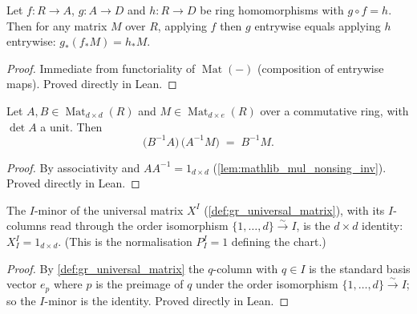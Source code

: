 \begin{lemma}\leanok
  \label{lem:gr_map_map_eq_of_comp}
  Let \(f : R \to A\), \(g : A \to D\) and \(h : R \to D\) be ring
  homomorphisms with \(g \circ f = h\). Then for any matrix \(M\) over \(R\),
  applying \(f\) then \(g\) entrywise equals applying \(h\) entrywise:
  \(g_\ast(f_\ast M) = h_\ast M\).
\end{lemma}
\begin{proof}

\leanok
  Immediate from functoriality of \(\operatorname{Mat}(-)\) (composition of
  entrywise maps). Proved directly in Lean.
\end{proof}

\begin{lemma}\leanok
  \label{lem:gr_inv_mul_inv_mul_cancel}
  Let \(A, B \in \operatorname{Mat}_{d\times d}(R)\) and
  \(M \in \operatorname{Mat}_{d\times e}(R)\) over a commutative ring, with
  \(\det A\) a unit. Then
  \[
    \bigl(B^{-1} A\bigr)\,\bigl(A^{-1} M\bigr) \;=\; B^{-1} M.
  \]
\end{lemma}
\begin{proof}

\leanok
  By associativity and \(A A^{-1} = 1_{d\times d}\)
  (\cref{lem:mathlib_mul_nonsing_inv}). Proved directly in Lean.
\end{proof}

\begin{lemma}\leanok
  \label{lem:gr_universalMatrix_submatrix_self}
  The \(I\)-minor of the universal matrix \(X^I\)
  (\cref{def:gr_universal_matrix}), with its \(I\)-columns read through the order
  isomorphism \(\{1,\dots,d\} \xrightarrow{\sim} I\), is the \(d\times d\)
  identity: \(X^I_I = 1_{d\times d}\). (This is the normalisation \(P^I_I = 1\)
  defining the chart.)
\end{lemma}
\begin{proof}

\leanok
  By \cref{def:gr_universal_matrix} the \(q\)-column with \(q \in I\) is the
  standard basis vector \(e_p\) where \(p\) is the preimage of \(q\) under the
  order isomorphism \(\{1,\dots,d\} \xrightarrow{\sim} I\); so the \(I\)-minor
  is the identity. Proved directly in Lean.
\end{proof}

